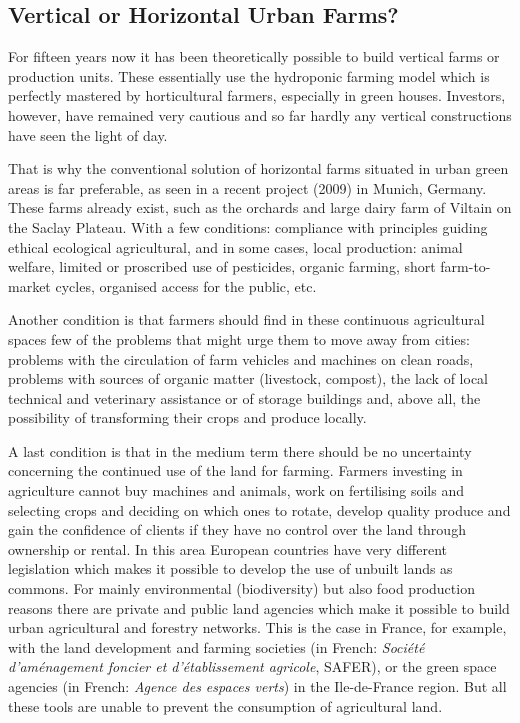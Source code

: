 \documentclass[10pt,a4paper]{article}
\begin{document}
\begin{multicols}{2}
\subsection{Vertical or Horizontal Urban Farms?}
\noindent For fifteen years now it has been theoretically possible to build vertical farms or production units. These essentially use the hydroponic farming model which is perfectly mastered by horticultural farmers, especially in green houses. Investors, however, have remained very cautious and so far hardly any vertical constructions have seen the light of day.

That is why the conventional solution of horizontal farms situated in urban green areas is far preferable, as seen in a recent project (2009) in Munich,  Germany. These farms already exist, such as the orchards and large dairy farm of Viltain on the Saclay Plateau. With a few conditions: compliance with principles guiding ethical ecological agricultural, and in some cases, local production: animal welfare, limited or proscribed use of pesticides, organic farming, short farm-to-market cycles, organised access for the public, etc.

Another condition is that farmers should find in these continuous agricultural spaces few of the problems that might urge them to move away from cities: problems with the circulation of farm vehicles and machines on clean roads, problems with sources of organic matter (livestock, compost), the lack of local technical and veterinary assistance or of storage buildings and, above all, the possibility of transforming their crops and produce locally.

A last condition is that in the medium term there should be no uncertainty concerning the continued use of the land for farming. Farmers investing in agriculture cannot buy machines and animals, work on fertilising soils and selecting crops and deciding on which ones to rotate, develop quality produce and gain the confidence of clients if they have no control over the land through ownership or rental. In this area European countries have very different legislation which makes it possible to develop the use of unbuilt lands as commons. For mainly environmental (biodiversity) but also food production reasons there are private and public land agencies which make it possible to build urban agricultural and forestry networks. This is the case in France, for example, with the land development and farming societies (in French: \textit{Société d’aménagement foncier et d’établissement agricole}, SAFER), or the green space agencies (in French: \textit{Agence des espaces verts}) in the Ile-de-France region. But all these tools are unable to prevent the consumption of agricultural land.


\end{multicols}
\end{document}

